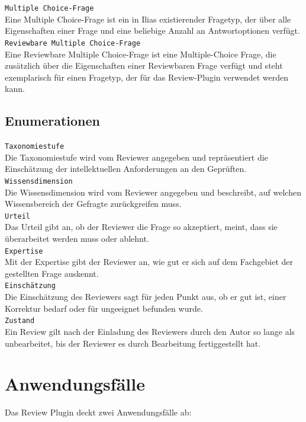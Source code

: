 \documentclass[a4paper]{scrreprt}
\begin{document}
\texttt{Multiple Choice-Frage}\\
Eine Multiple Choice-Frage ist ein in Ilias existierender Fragetyp, der über alle Eigenschaften einer Frage und eine beliebige Anzahl an Antwortoptionen verfügt.\\

\texttt{Reviewbare Multiple Choice-Frage}\\
Eine Reviewbare Multiple Choice-Frage ist eine Multiple-Choice Frage, die zusätzlich über die Eigenschaften einer Reviewbaren Frage verfügt und steht exemplarisch für einen Fragetyp, der für das Review-Plugin verwendet werden kann.
\section{Enumerationen}
\texttt{Taxonomiestufe}\\
Die Taxonomiestufe wird vom Reviewer angegeben und repräsentiert die Einschätzung der intellektuellen Anforderungen an den Geprüften.\\

\texttt{Wissensdimension}\\
Die Wissensdimension wird vom Reviewer angegeben und beschreibt, auf welchen Wissensbereich der Gefragte zurückgreifen muss.\\

\texttt{Urteil}\\
Das Urteil gibt an, ob der Reviewer die Frage so akzeptiert, meint, dass sie überarbeitet werden muss oder ablehnt.\\

\texttt{Expertise}\\
Mit der Expertise gibt der Reviewer an, wie gut er sich auf dem Fachgebiet der gestellten Frage auskennt.\\

\texttt{Einschätzung}\\
Die Einschätzung des Reviewers sagt für jeden Punkt aus, ob er gut ist, einer Korrektur bedarf oder für ungeeignet befunden wurde.\\

\texttt{Zustand}\\
Ein Review gilt nach der Einladung des Reviewers durch den Autor so lange als unbearbeitet, bis der Reviewer es durch Bearbeitung fertiggestellt hat.
\chapter{Anwendungsfälle}
Das Review Plugin deckt zwei Anwendungsfälle ab: 
\end{document}
